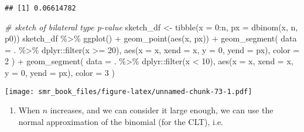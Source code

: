 \documentclass[
  oneside]{book}
\newenvironment{Shaded}{\begin{snugshade}}{\end{snugshade}}
\newcommand{\AttributeTok}[1]{\textcolor[rgb]{0.77,0.63,0.00}{#1}}
\newcommand{\CommentTok}[1]{\textcolor[rgb]{0.56,0.35,0.01}{\textit{#1}}}
\newcommand{\DecValTok}[1]{\textcolor[rgb]{0.00,0.00,0.81}{#1}}
\newcommand{\FunctionTok}[1]{\textcolor[rgb]{0.00,0.00,0.00}{#1}}
\newcommand{\NormalTok}[1]{#1}
\newcommand{\OtherTok}[1]{\textcolor[rgb]{0.56,0.35,0.01}{#1}}
\newcommand{\SpecialCharTok}[1]{\textcolor[rgb]{0.00,0.00,0.00}{#1}}
\providecommand{\tightlist}{%
  \setlength{\itemsep}{0pt}\setlength{\parskip}{0pt}}
\begin{document}
\begin{Shaded}
\end{Shaded}

\begin{verbatim}
## [1] 0.06614782
\end{verbatim}

\begin{Shaded}
\begin{Highlighting}[]
\CommentTok{\# sketch of bilateral type p{-}value}
\NormalTok{sketch\_df }\OtherTok{\textless{}{-}} \FunctionTok{tibble}\NormalTok{(}\AttributeTok{x =} \DecValTok{0}\SpecialCharTok{:}\NormalTok{n, }\AttributeTok{px =} \FunctionTok{dbinom}\NormalTok{(x, n, p0))}
\NormalTok{sketch\_df }\SpecialCharTok{\%\textgreater{}\%}
  \FunctionTok{ggplot}\NormalTok{() }\SpecialCharTok{+}
  \FunctionTok{geom\_point}\NormalTok{(}\FunctionTok{aes}\NormalTok{(x, px)) }\SpecialCharTok{+}
  \FunctionTok{geom\_segment}\NormalTok{(}
    \AttributeTok{data =}\NormalTok{ . }\SpecialCharTok{\%\textgreater{}\%}\NormalTok{ dplyr}\SpecialCharTok{::}\FunctionTok{filter}\NormalTok{(x }\SpecialCharTok{\textgreater{}=} \DecValTok{20}\NormalTok{),}
    \FunctionTok{aes}\NormalTok{(}\AttributeTok{x =}\NormalTok{ x, }\AttributeTok{xend =}\NormalTok{ x, }\AttributeTok{y =} \DecValTok{0}\NormalTok{, }\AttributeTok{yend =}\NormalTok{ px), }\AttributeTok{color =} \DecValTok{2}
\NormalTok{  ) }\SpecialCharTok{+}
  \FunctionTok{geom\_segment}\NormalTok{(}
    \AttributeTok{data =}\NormalTok{ . }\SpecialCharTok{\%\textgreater{}\%}\NormalTok{ dplyr}\SpecialCharTok{::}\FunctionTok{filter}\NormalTok{(x }\SpecialCharTok{\textless{}} \DecValTok{10}\NormalTok{),}
    \FunctionTok{aes}\NormalTok{(}\AttributeTok{x =}\NormalTok{ x, }\AttributeTok{xend =}\NormalTok{ x, }\AttributeTok{y =} \DecValTok{0}\NormalTok{, }\AttributeTok{yend =}\NormalTok{ px), }\AttributeTok{color =} \DecValTok{3}
\NormalTok{  )}
\end{Highlighting}
\end{Shaded}

\texttt{[image: smr\_book\_files/figure-latex/unnamed-chunk-73-1.pdf]}

\begin{enumerate}
\def\labelenumi{\alph{enumi}.}
\setcounter{enumi}{2}
\tightlist
\item
  When \(n\) increases, and we can consider it large enough, we can
  use the normal approximation of the binomial (for the CLT), i.e.
\end{enumerate}
\end{document}
